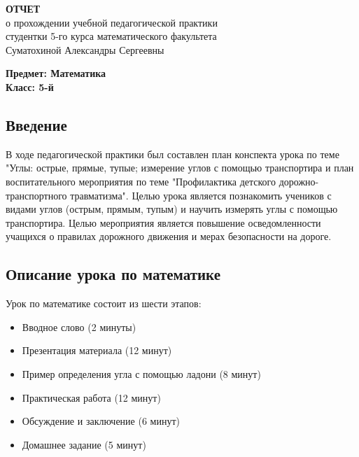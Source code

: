 \documentclass[a4paper,12pt]{article}
\begin{document}
\begin{center}
\textbf{ОТЧЕТ}\\
о прохождении учебной педагогической практики\\
студентки 5-го курса математического факультета\\
Суматохиной Александры Сергеевны
\end{center}

\noindent
\textbf{Предмет: Математика}\\
\textbf{Класс: 5-й}\\

\subsection*{Введение}

В ходе педагогической практики был составлен план конспекта урока по теме "Углы: острые, прямые, тупые; измерение углов с помощью транспортира и план воспитательного мероприятия по теме "Профилактика детского дорожно-транспортного травматизма". Целью урока является познакомить учеников с видами углов (острым, прямым, тупым) и научить измерять углы с помощью транспортира. Целью мероприятия является повышение осведомленности учащихся о правилах дорожного движения и мерах безопасности на дороге.

\subsection*{Описание урока по математике}
Урок по математике состоит из шести этапов:
\begin{itemize}
    \item Вводное слово (2 минуты)
    \item Презентация материала (12 минут)
    \item Пример определения угла с помощью ладони (8 минут)
    \item Практическая работа (12 минут)
    \item Обсуждение и заключение (6 минут)
    \item Домашнее задание (5 минут)
\end{itemize}
\end{document}
